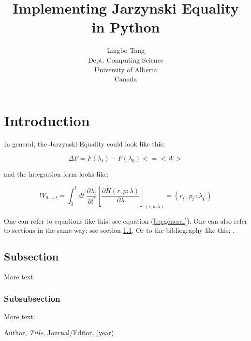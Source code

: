 \documentclass{article}
\title{Implementing Jarzynski Equality in Python}
\author{Lingbo Tang\\
  \small Dept. Computing Science\\
  \small University of Alberta\\
  \small Canada
}
\theoremstyle{definition}
\theoremstyle{remark}
\begin{document}
\maketitle


\section{Introduction}

In general, the Jarzynski Equality could look like this:

\begin{equation}\label{eq:general}
  \Delta F = F(\lambda_{t}) - F(\lambda_{0}) <= < W >
\end{equation}

and the integration form looks like:

\begin{equation}\label{eq:integration}
  W_{0\rightarrow t} = \int_{0}^{t} dt^{'} \frac{\partial \lambda_t^{'}}{\partial t^{'}} [\frac{\partial \tilde{H} (r, p; \lambda)}{\partial \lambda} ]_{(r,p; \lambda)} = (r_{t^{'}}, p_{t^{'}} ; \lambda_{t^{'}})
\end{equation}

One can refer to equations like this: see equation (\ref{eq:general}). One can also
refer to sections in the same way: see section \ref{sec:nothing}. Or
to the bibliography like this: \cite{Cd94}.

\subsection{Subsection}\label{sec:nothing}

More text.

\subsubsection{Subsubsection}\label{sec:nothing2}

More text.

\begin{thebibliography}{99}

 Author, \emph{Title}, Journal/Editor, (year)

\end{thebibliography}
\end{document}
